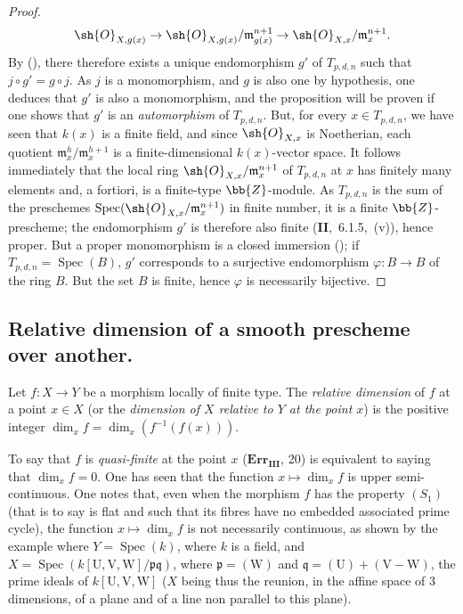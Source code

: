 \begin{proof}
\[  \sh{O}_{X,g(x)} \to \sh{O}_{X,g(x)}/\mathfrak{m}_{g(x)}^{n+1} \to \sh{O}_{X,x}/\mathfrak{m}_x^{n+1}.
\]
By (), there therefore exists a unique endomorphism $g'$ of $T_{p,d,n}$ such that $j\circ g'=g\circ j$.
As $j$ is a monomorphism, and $g$ is also one by hypothesis, one deduces that $g'$ is also a monomorphism, and the proposition will be proven if one shows that $g'$ is an \emph{automorphism} of $T_{p,d,n}$.
But, for every $x\in T_{p,d,n}$, we have seen that $k(x)$ is a finite field, and since $\sh{O}_{X,x}$ is Noetherian, each quotient $\mathfrak{m}_x^h/\mathfrak{m}_x^{h+1}$ is a finite-dimensional $k(x)$-vector space.
It follows immediately that the local ring $\sh{O}_{X,x}/\mathfrak{m}_x^{n+1}$ of $T_{p,d,n}$ at $x$ has finitely many elements and, a fortiori, is a finite-type $\bb{Z}$-module.
As $T_{p,d,n}$ is the sum of the preschemes $\operatorname{Spec}(\sh{O}_{X,x}/\mathfrak{m}_x^{n+1})$ in finite number, it is a finite $\bb{Z}$-prescheme; the endomorphism $g'$ is therefore also finite (\textbf{II},~6.1.5,~(v)), hence proper.
But a proper monomorphism is a closed immersion (); if $T_{p,d,n}=\operatorname{Spec}(B)$, $g'$ corresponds to a surjective endomorphism $\varphi:B\to B$ of the ring $B$.
But the set $B$ is finite, hence $\varphi$ is necessarily bijective.
\end{proof}


\subsection{Relative dimension of a smooth prescheme over another.}
\label{subsection:IV.17.10}


\begin{definition}[17.10.1]
\label{IV.17.10.1}
Let $f:X\to Y$ be a morphism locally of finite type.
The \emph{relative dimension} of $f$ at a point $x\in X$ (or the \emph{dimension of $X$ relative to $Y$ at the point $x$}) is the positive integer $\dim_x f=\dim_x(f^{-1}(f(x)))$.
\end{definition}

To say that $f$ is \emph{quasi-finite} at the point $x$ ($\mathbf{Err_{III}}$, 20) is equivalent to saying that $\dim_x f=0$.
One has seen  that the function $x\mapsto\dim_x f$ is upper semi-continuous.
One notes that, even when the morphism $f$ has the property $(S_1)$ (that is to say  is flat and such that its fibres have no embedded associated prime cycle), the function $x\mapsto\dim_x f$ is not necessarily continuous, as shown by the example where $Y=\operatorname{Spec}(k)$, where $k$ is a field, and $X=\operatorname{Spec}(k[\mathrm{U},\mathrm{V},\mathrm{W}]/\mathfrak{p}\mathfrak{q})$, where $\mathfrak{p}=(\mathrm{W})$ and $\mathfrak{q}=(\mathrm{U})+(\mathrm{V}-\mathrm{W})$, the prime ideals of $k[\mathrm{U},\mathrm{V},\mathrm{W}]$ ($X$ being thus the reunion, in the affine space of $3$ dimensions, of a plane and of a line non parallel to this plane).

